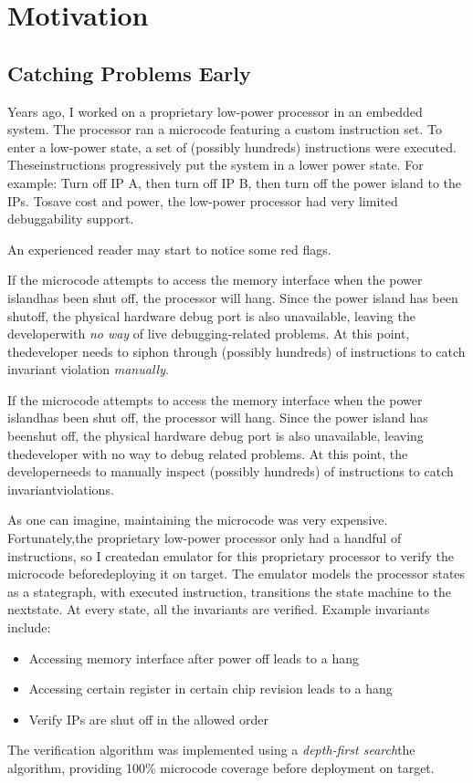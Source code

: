 
\chapter{Motivation}

\section{Catching Problems Early} 

Years ago, I worked on a proprietary low-power processor in an embedded
system. The processor ran a microcode featuring a custom instruction set. To
enter a low-power state, a set of (possibly hundreds) instructions were
executed. Theseinstructions progressively put the system in a lower power state.
For example: Turn off IP A, then turn off IP B, then turn off the power island
to the IPs. Tosave cost and power, the low-power processor had very limited
debuggability support.\newline

An experienced reader may start to notice some red flags.\newline

If the microcode attempts to access the memory interface when the power
islandhas been shut off, the processor will hang. Since the power island has
been shutoff, the physical hardware debug port is also unavailable, leaving the
developerwith \textit{no way} of live debugging-related problems. At this point,
thedeveloper needs to siphon through (possibly hundreds) of instructions to
catch invariant violation \textit{manually}.\newline

If the microcode attempts to access the memory interface when the power
islandhas been shut off, the processor will hang. Since the power island has
beenshut off, the physical hardware debug port is also unavailable, leaving
thedeveloper with no way to debug related problems. At this point, the
developerneeds to manually inspect (possibly hundreds) of instructions to catch
invariantviolations.\newline

As one can imagine, maintaining the microcode was very expensive. Fortunately,the proprietary low-power processor only had a handful of instructions, so I createdan emulator for this proprietary processor to verify the microcode beforedeploying it on target. The emulator models the processor states as a stategraph, with executed instruction, transitions the state machine to the nextstate. At every state, all the invariants are verified. Example invariants include:
\begin{itemize} 
    \item Accessing memory interface after power off leads to a hang 
    \item Accessing certain register in certain chip revision leads to a hang \item Verify IPs are shut off in the allowed order
\end{itemize}
The verification algorithm was implemented using a \textit{depth-first
search}the algorithm, providing 100\% microcode coverage before deployment on
target.\newline

